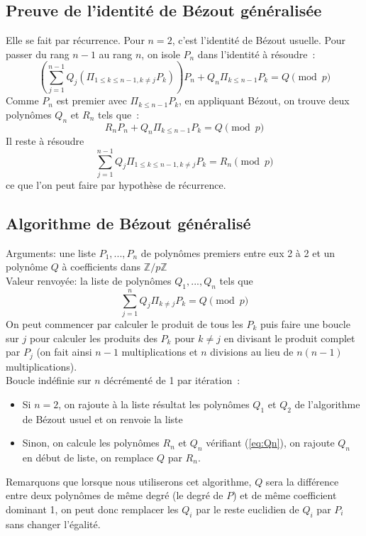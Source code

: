 \documentclass[a4paper,11pt]{article}
\newcommand{\Z}{{\mathbb{Z}}}
\begin{document}
\subsection{Preuve de l'identité de Bézout généralisée}
Elle se fait par récurrence. Pour $n=2$, c'est l'identité de Bézout usuelle. 
Pour passer
du rang $n-1$ au rang $n$, on isole $P_n$ dans l'identité à résoudre~:
\[ \left( 
\sum_{j=1}^{n-1} Q_j (\Pi_{1 \leq k \leq n-1,k\neq j} P_k) \right) P_n + 
Q_n \Pi_{k\leq n-1} P_k =Q \pmod p\]
Comme $P_n$ est premier avec $\Pi_{k\leq n-1} P_k$, en appliquant Bézout,
on trouve deux polynômes $Q_n$ et $R_n$ tels que~:
\begin{equation} \label{eq:Qn}
 R_n P_n + Q_n \Pi_{k\leq n-1} P_k =Q \pmod p 
\end{equation}
Il reste à résoudre
\[ \sum_{j=1}^{n-1} Q_j \Pi_{1 \leq k \leq n-1,k\neq j} P_k=R_n \pmod p\]
ce que l'on peut faire par hypothèse de récurrence.

\subsection{Algorithme de Bézout généralisé}
Arguments: une liste $P_1,...,P_n$ de polynômes premiers entre eux 2 à 2  
et un polynôme $Q$ à coefficients dans $\Z/p\Z$\\
Valeur renvoyée: la liste de polynômes $Q_1,...,Q_n$ tels que
\[ \sum_{j=1}^n Q_j \Pi_{k\neq j} P_k=Q \pmod p \]
On peut commencer par calculer le produit de tous les $P_k$ puis faire une 
boucle sur $j$ pour calculer les produits des $P_k$ pour $k\neq j$ en divisant
le produit complet par $P_j$ (on fait ainsi $n-1$ multiplications et
$n$ divisions au lieu de $n(n-1)$ multiplications).\\
Boucle indéfinie sur $n$ décrémenté de 1 par itération~:
\begin{itemize}
\item Si $n=2$, on rajoute à la liste résultat les polynômes 
$Q_1$ et $Q_2$ de l'algorithme de Bézout usuel et on renvoie la liste
\item Sinon, on calcule les polynômes $R_n$ et $Q_n$ vérifiant (\ref{eq:Qn}),
on rajoute $Q_n$ en début de liste, on remplace $Q$ par $R_n$.
\end{itemize}
Remarquons que lorsque nous utiliserons cet algorithme, $Q$ sera la différence
entre deux polynômes de même degré (le degré de $P$) et de même coefficient
dominant 1, on peut donc
remplacer les $Q_i$ par le reste euclidien de $Q_i$ par $P_i$ sans
changer l'égalité.
\end{document}
